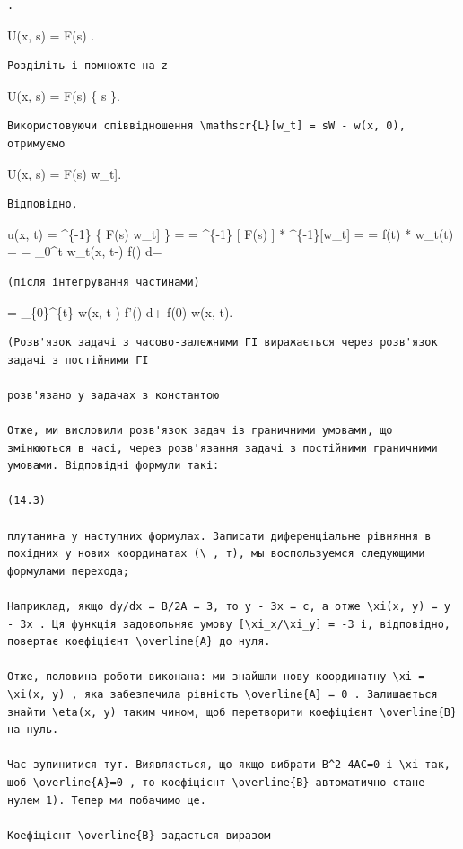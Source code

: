\documentclass[
  ukrainian,
]{article}
\begin{document}
\begin{verbatim}
.
\end{verbatim}

U(x, s) = F(s) .

\begin{verbatim}
Розділіть і помножте на z
\end{verbatim}

U(x, s) = F(s) \left\{ s
 \right\}.

\begin{verbatim}
Використовуючи співвідношення \mathscr{L}[w_t] = sW - w(x, 0), отримуємо
\end{verbatim}

U(x, s) = F(s) \mathcal{L}{[}w\_t{]}.

\begin{verbatim}
Відповідно,
\end{verbatim}

u(x, t) = \^{}\{-1\} \{ F(s) \mathcal{L}{[}w\_t{]} \} = =
\^{}\{-1\} {[} F(s) {]} * \^{}\{-1\}{[}w\_t{]} = =
f(t) * w\_t(t) = = \int\_0\^{}t w\_t(x, t-\tau) f(\tau) d\tau =

\begin{verbatim}
(після інтегрування частинами)
\end{verbatim}

= \int\_\{0\}\^{}\{t\} w(x, t-\tau) f'(\tau) d\tau + f(0) w(x, t).

\begin{verbatim}
(Розв'язок задачі з часово-залежними ГІ виражається через розв'язок задачі з постійними ГІ

розв'язано у задачах з константою

Отже, ми висловили розв'язок задач із граничними умовами, що змінюються в часі, через розв'язання задачі з постійними граничними умовами. Відповідні формули такі:

(14.3)

плутанина у наступних формулах. Записати диференціальне рівняння в похідних у нових координатах (\ , т), мы воспользуемся следующими формулами перехода;

Наприклад, якщо dy/dx = B/2A = 3, то y - 3x = c, а отже \xi(x, y) = y - 3x . Ця функція задовольняє умову [\xi_x/\xi_y] = -3 і, відповідно, повертає коефіцієнт \overline{A} до нуля.

Отже, половина роботи виконана: ми знайшли нову координатну \xi = \xi(x, y) , яка забезпечила рівність \overline{A} = 0 . Залишається знайти \eta(x, y) таким чином, щоб перетворити коефіцієнт \overline{B} на нуль.

Час зупинитися тут. Виявляється, що якщо вибрати B^2-4AC=0 і \xi так, щоб \overline{A}=0 , то коефіцієнт \overline{B} автоматично стане нулем 1). Тепер ми побачимо це.

Коефіцієнт \overline{B} задається виразом
\end{verbatim}
\end{document}
